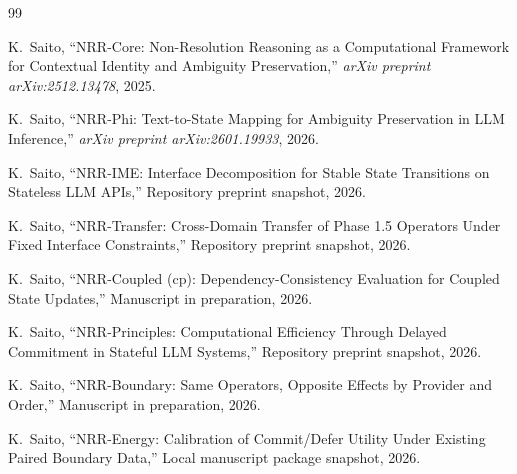 \documentclass[11pt]{article}
\begin{document}
\begin{thebibliography}{99}
\raggedright

K.~Saito,
\newblock ``NRR-Core: Non-Resolution Reasoning as a Computational Framework for Contextual Identity and Ambiguity Preservation,''
\newblock \emph{arXiv preprint arXiv:2512.13478}, 2025.

K.~Saito,
\newblock ``NRR-Phi: Text-to-State Mapping for Ambiguity Preservation in LLM Inference,''
\newblock \emph{arXiv preprint arXiv:2601.19933}, 2026.

K.~Saito,
\newblock ``NRR-IME: Interface Decomposition for Stable State Transitions on Stateless LLM APIs,''
\newblock Repository preprint snapshot, 2026.

K.~Saito,
\newblock ``NRR-Transfer: Cross-Domain Transfer of Phase 1.5 Operators Under Fixed Interface Constraints,''
\newblock Repository preprint snapshot, 2026.

K.~Saito,
\newblock ``NRR-Coupled (cp): Dependency-Consistency Evaluation for Coupled State Updates,''
\newblock Manuscript in preparation, 2026.

K.~Saito,
\newblock ``NRR-Principles: Computational Efficiency Through Delayed Commitment in Stateful LLM Systems,''
\newblock Repository preprint snapshot, 2026.

K.~Saito,
\newblock ``NRR-Boundary: Same Operators, Opposite Effects by Provider and Order,''
\newblock Manuscript in preparation, 2026.

K.~Saito,
\newblock ``NRR-Energy: Calibration of Commit/Defer Utility Under Existing Paired Boundary Data,''
\newblock Local manuscript package snapshot, 2026.

\end{thebibliography}
\end{document}
